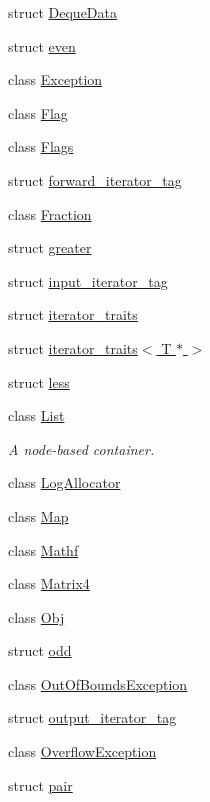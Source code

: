 \begin{DoxyCompactItemize}
struct \hyperlink{structprism_1_1_deque_data}{Deque\+Data}
\item 
struct \hyperlink{structprism_1_1even}{even}
\item 
class \hyperlink{classprism_1_1_exception}{Exception}
\item 
class \hyperlink{classprism_1_1_flag}{Flag}
\item 
class \hyperlink{classprism_1_1_flags}{Flags}
\item 
struct \hyperlink{structprism_1_1forward__iterator__tag}{forward\+\_\+iterator\+\_\+tag}
\item 
class \hyperlink{classprism_1_1_fraction}{Fraction}
\item 
struct \hyperlink{structprism_1_1greater}{greater}
\item 
struct \hyperlink{structprism_1_1input__iterator__tag}{input\+\_\+iterator\+\_\+tag}
\item 
struct \hyperlink{structprism_1_1iterator__traits}{iterator\+\_\+traits}
\item 
struct \hyperlink{structprism_1_1iterator__traits_3_01_t_01_5_01_4}{iterator\+\_\+traits$<$ T $\ast$ $>$}
\item 
struct \hyperlink{structprism_1_1less}{less}
\item 
class \hyperlink{classprism_1_1_list}{List}
\begin{DoxyCompactList}\small\item\em A node-\/based container. \end{DoxyCompactList}\item 
class \hyperlink{classprism_1_1_log_allocator}{Log\+Allocator}
\item 
class \hyperlink{classprism_1_1_map}{Map}
\item 
class \hyperlink{classprism_1_1_mathf}{Mathf}
\item 
class \hyperlink{classprism_1_1_matrix4}{Matrix4}
\item 
class \hyperlink{classprism_1_1_obj}{Obj}
\item 
struct \hyperlink{structprism_1_1odd}{odd}
\item 
class \hyperlink{classprism_1_1_out_of_bounds_exception}{Out\+Of\+Bounds\+Exception}
\item 
struct \hyperlink{structprism_1_1output__iterator__tag}{output\+\_\+iterator\+\_\+tag}
\item 
class \hyperlink{classprism_1_1_overflow_exception}{Overflow\+Exception}
\item 
struct \hyperlink{structprism_1_1pair}{pair}

\end{DoxyCompactItemize}

